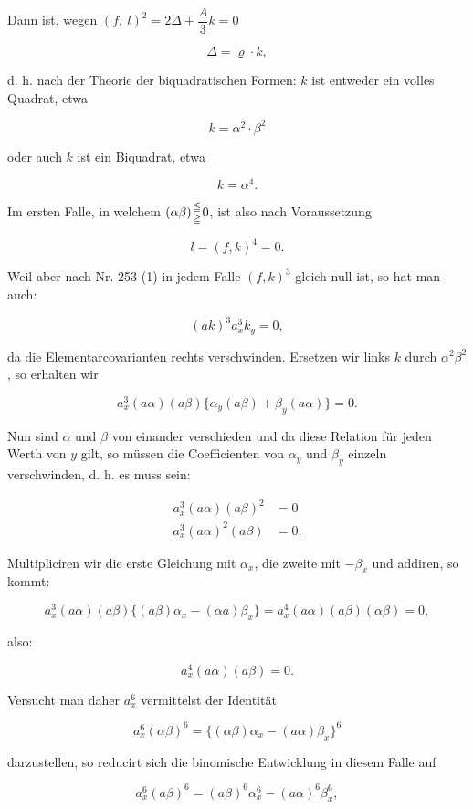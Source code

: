 Dann ist, wegen $(f,\ l)^2 = 2\varDelta + \dfrac{A}{3} k = 0$

\[ \varDelta = \varrho \cdot k, \]

d. h. nach der Theorie der biquadratischen Formen: $k$ ist entweder ein volles Quadrat, etwa

\[ k = \alpha^2 \cdot \beta^2 \]



oder auch $k$ ist ein Biquadrat, etwa

\[
k = \alpha^4.
\]

Im ersten Falle, in welchem $(\alpha\beta)\genfrac{}{}{0pt}{}{\leqq}{\geqq}0$, ist also nach Voraussetzung

\[
l = (f, k)^4 = 0.
\]

Weil aber nach Nr. 253 (1) in jedem Falle $(f, k)^3$ gleich null ist, so hat man auch:

\[
(ak)^3 a_x^3 k_y = 0,
\]

da die Elementarcovarianten rechts verschwinden. Ersetzen wir links $k$ durch $\alpha^2\beta^2$, so erhalten wir

\[
a_x^3 (a\alpha)(a\beta)\{\alpha_y(a\beta) + \beta_y(a\alpha)\} = 0.
\]

Nun sind $\alpha$ und $\beta$ von einander verschieden und da diese Relation für jeden Werth von $y$ gilt, so müssen die Coefficienten von $\alpha_y$ und $\beta_y$ einzeln verschwinden, d. h. es muss sein:

\[
\begin{aligned}
a_x^3(a\alpha)(a\beta)^2 &= 0\\
a_x^3(a\alpha)^2(a\beta) &= 0.
\end{aligned}
\]

Multipliciren wir die erste Gleichung mit $\alpha_x$, die zweite mit $-\beta_x$ und addiren, so kommt:

\[
a_x^3(a\alpha)(a\beta)\{(a\beta)\alpha_x - (\alpha a)\beta_x\} = a_x^4(a\alpha)(a\beta)(\alpha\beta) = 0,
\]

also:

\[
a_x^4(a\alpha)(a\beta) = 0.
\]

Versucht man daher $a_x^6$ vermittelst der Identität

\[
a_x^6(\alpha\beta)^6 = \{(\alpha\beta)\alpha_x - (a\alpha)\beta_x\}^6
\]

darzustellen, so reducirt sich die binomische Entwicklung in diesem Falle auf

\[
a_x^6(a\beta)^6 = (a\beta)^6\alpha_x^6 - (a\alpha)^6\beta_x^6,
\]

